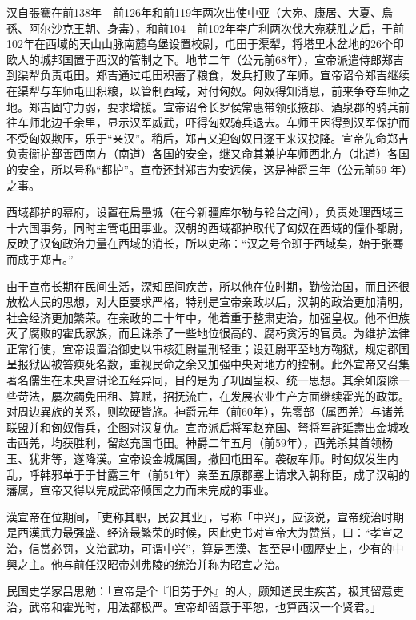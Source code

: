 汉自張騫在前138年—前126年和前119年两次出使中亚（大宛、康居、大夏、烏孫、阿尔沙克王朝、身毒），和前104—前102年李广利两次伐大宛获胜之后，于前102年在西域的天山山脉南麓乌堡设置校尉，屯田于渠犁，将塔里木盆地的26个印欧人的城邦国置于西汉的管制之下。地节二年（公元前68年），宣帝派遣侍郎郑吉到渠犁负责屯田。郑吉通过屯田积蓄了粮食，发兵打败了车师。宣帝诏令郑吉继续在渠犁与车师屯田积粮，以管制西域，对付匈奴。匈奴得知消息，前来争夺车师之地。郑吉固守力弱，要求增援。宣帝诏令长罗侯常惠带领张掖郡、酒泉郡的骑兵前往车师北边千余里，显示汉军威武，吓得匈奴骑兵退去。车师王因得到汉军保护而不受匈奴欺压，乐于“亲汉”。稍后，郑吉又迎匈奴日逐王来汉投降。宣帝先命郑吉负责衞护鄯善西南方（南道）各国的安全，继又命其兼护车师西北方（北道）各国的安全，所以号称“都护”。宣帝还封郑吉为安远侯，这是神爵三年（公元前59 年）之事。

西域都护的幕府，设置在烏壘城（在今新疆库尔勒与轮台之间），负责处理西域三十六国事务，同时主管屯田事业。汉朝的西域都护取代了匈奴在西域的僮仆都尉，反映了汉匈政治力量在西域的消长，所以史称：“汉之号令班于西域矣，始于张骞而成于郑吉。”

由于宣帝长期在民间生活，深知民间疾苦，所以他在位时期，勤俭治国，而且还很放松人民的思想，对大臣要求严格，特别是宣帝亲政以后，汉朝的政治更加清明，社会经济更加繁荣。在亲政的二十年中，他着重于整肃吏治，加强皇权。他不但族灭了腐败的霍氏家族，而且诛杀了一些地位很高的、腐朽贪污的官员。为维护法律正常行使，宣帝设置治御史以审核廷尉量刑轻重；设廷尉平至地方鞠狱，规定郡国呈报狱囚被笞瘐死名数，重视民命之余又加强中央对地方的控制。此外宣帝又召集著名儒生在未央宫讲论五经异同，目的是为了巩固皇权、统一思想。其余如废除一些苛法，屡次蠲免田租、算赋，招抚流亡，在发展农业生产方面继续霍光的政策。对周边異族的关系，则软硬皆施。神爵元年（前60年），先零部（属西羌）与诸羌联盟并和匈奴借兵，企图对汉复仇。宣帝派后将军赵充国、弩将军許延壽出金城攻击西羌，均获胜利，留赵充国屯田。神爵二年五月（前59年），西羌杀其首领杨玉、犹非等，遂降漢。宣帝设金城属国，撤回屯田军。袭破车师。时匈奴发生内乱，呼韩邪单于于甘露三年（前51年）亲至五原郡塞上请求入朝称臣，成了汉朝的藩属，宣帝又得以完成武帝倾国之力而未完成的事业。

漢宣帝在位期间，「吏称其职，民安其业」，号称「中兴」，应该说，宣帝统治时期是西漢武力最强盛、经济最繁荣的时候，因此史书对宣帝大为赞赏，曰：“孝宣之治，信赏必罚，文治武功，可谓中兴”，算是西漢、甚至是中國歷史上，少有的中興之主。他与前任汉昭帝刘弗陵的统治并称为昭宣之治。

民国史学家吕思勉：「宣帝是个『旧劳于外』的人，颇知道民生疾苦，极其留意吏治，武帝和霍光时，用法都极严。宣帝却留意于平恕，也算西汉一个贤君。」

